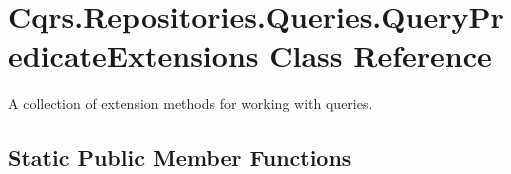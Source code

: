 \hypertarget{classCqrs_1_1Repositories_1_1Queries_1_1QueryPredicateExtensions}{}\section{Cqrs.\+Repositories.\+Queries.\+Query\+Predicate\+Extensions Class Reference}
\label{classCqrs_1_1Repositories_1_1Queries_1_1QueryPredicateExtensions}


A collection of extension methods for working with queries.  


\subsection*{Static Public Member Functions}
